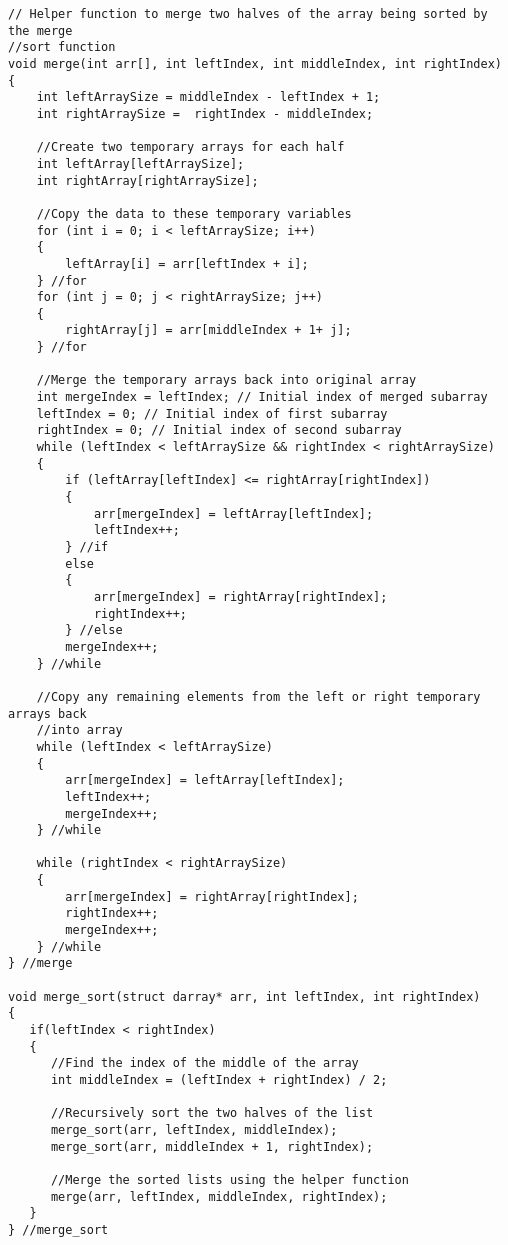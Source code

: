 \documentclass{article}
\begin{document}
\begin{verbatim}
// Helper function to merge two halves of the array being sorted by the merge
//sort function
void merge(int arr[], int leftIndex, int middleIndex, int rightIndex)
{
    int leftArraySize = middleIndex - leftIndex + 1;
    int rightArraySize =  rightIndex - middleIndex;

    //Create two temporary arrays for each half
    int leftArray[leftArraySize];
    int rightArray[rightArraySize];

    //Copy the data to these temporary variables
    for (int i = 0; i < leftArraySize; i++)
    {
        leftArray[i] = arr[leftIndex + i];
    } //for
    for (int j = 0; j < rightArraySize; j++)
    {
        rightArray[j] = arr[middleIndex + 1+ j];
    } //for

    //Merge the temporary arrays back into original array
    int mergeIndex = leftIndex; // Initial index of merged subarray
    leftIndex = 0; // Initial index of first subarray
    rightIndex = 0; // Initial index of second subarray
    while (leftIndex < leftArraySize && rightIndex < rightArraySize)
    {
        if (leftArray[leftIndex] <= rightArray[rightIndex])
        {
            arr[mergeIndex] = leftArray[leftIndex];
            leftIndex++;
        } //if
        else
        {
            arr[mergeIndex] = rightArray[rightIndex];
            rightIndex++;
        } //else
        mergeIndex++;
    } //while

    //Copy any remaining elements from the left or right temporary arrays back
    //into array
    while (leftIndex < leftArraySize)
    {
        arr[mergeIndex] = leftArray[leftIndex];
        leftIndex++;
        mergeIndex++;
    } //while

    while (rightIndex < rightArraySize)
    {
        arr[mergeIndex] = rightArray[rightIndex];
        rightIndex++;
        mergeIndex++;
    } //while
} //merge

void merge_sort(struct darray* arr, int leftIndex, int rightIndex)
{
   if(leftIndex < rightIndex)
   {
      //Find the index of the middle of the array
      int middleIndex = (leftIndex + rightIndex) / 2;

      //Recursively sort the two halves of the list
      merge_sort(arr, leftIndex, middleIndex);
      merge_sort(arr, middleIndex + 1, rightIndex);

      //Merge the sorted lists using the helper function
      merge(arr, leftIndex, middleIndex, rightIndex);
   }
} //merge_sort
\end{verbatim}
\end{document}
